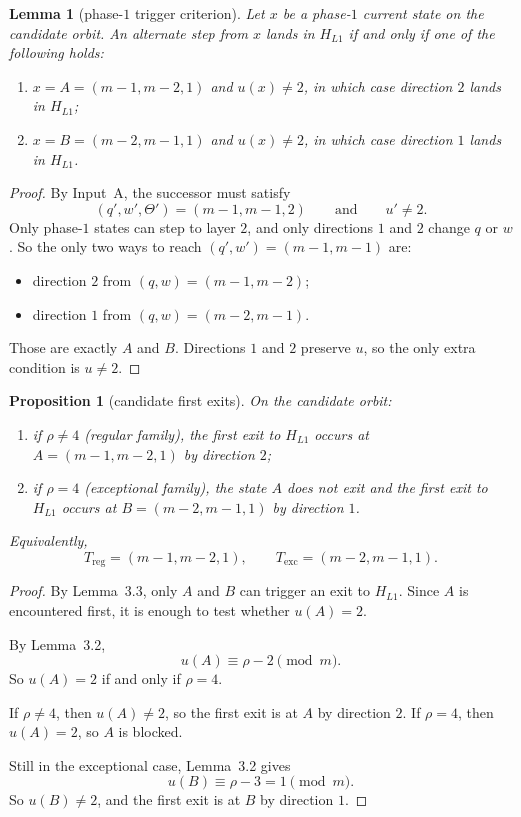 \documentclass[11pt]{article}
\newtheorem{proposition}[theorem]{Proposition}
\newtheorem{lemma}[theorem]{Lemma}
\begin{document}
\begin{lemma}[phase-$1$ trigger criterion]
Let $x$ be a phase-$1$ current state on the candidate orbit. An alternate step
from $x$ lands in $H_{L1}$ if and only if one of the following holds:
\begin{enumerate}[label=\textup{(\arabic*)},leftmargin=2.5em]
\item $x=A=(m-1,m-2,1)$ and $u(x)\neq 2$, in which case direction $2$ lands in
      $H_{L1}$;
\item $x=B=(m-2,m-1,1)$ and $u(x)\neq 2$, in which case direction $1$ lands in
      $H_{L1}$.
\end{enumerate}
\end{lemma}

\begin{proof}
By Input~A, the successor must satisfy
\[
(q',w',\Theta')=(m-1,m-1,2)
\qquad\text{and}\qquad
u'\neq 2.
\]
Only phase-$1$ states can step to layer $2$, and only directions $1$ and $2$
change $q$ or $w$. So the only two ways to reach $(q',w')=(m-1,m-1)$ are:
\begin{itemize}[leftmargin=2em]
\item direction $2$ from $(q,w)=(m-1,m-2)$;
\item direction $1$ from $(q,w)=(m-2,m-1)$.
\end{itemize}
Those are exactly $A$ and $B$. Directions $1$ and $2$ preserve $u$, so the only
extra condition is $u\neq 2$.
\end{proof}

\begin{proposition}[candidate first exits]
On the candidate orbit:
\begin{enumerate}[label=\textup{(\arabic*)},leftmargin=2.5em]
\item if $\rho\neq 4$ (regular family), the first exit to $H_{L1}$ occurs at
      $A=(m-1,m-2,1)$ by direction $2$;
\item if $\rho=4$ (exceptional family), the state $A$ does not exit and the
      first exit to $H_{L1}$ occurs at $B=(m-2,m-1,1)$ by direction $1$.
\end{enumerate}
Equivalently,
\[
T_{\mathrm{reg}}=(m-1,m-2,1),
\qquad
T_{\mathrm{exc}}=(m-2,m-1,1).
\]
\end{proposition}

\begin{proof}
By Lemma~3.3, only $A$ and $B$ can trigger an exit to $H_{L1}$. Since $A$ is
encountered first, it is enough to test whether $u(A)=2$.

By Lemma~3.2,
\[
u(A)\equiv \rho-2 \pmod m.
\]
So $u(A)=2$ if and only if $\rho=4$.

If $\rho\neq 4$, then $u(A)\neq 2$, so the first exit is at $A$ by direction
$2$. If $\rho=4$, then $u(A)=2$, so $A$ is blocked.

Still in the exceptional case, Lemma~3.2 gives
\[
u(B)\equiv \rho-3 = 1 \pmod m.
\]
So $u(B)\neq 2$, and the first exit is at $B$ by direction $1$.
\end{proof}
\end{document}
